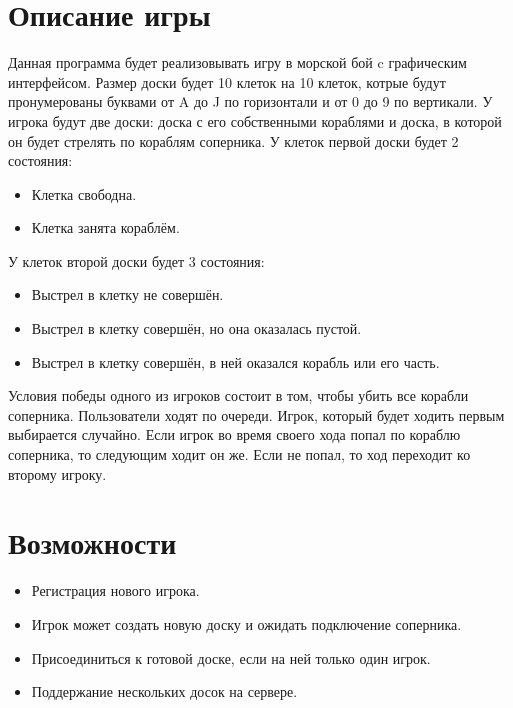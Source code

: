 \documentclass[a4paper,14pt]{extarticle} %
\begin{document}
\section*{Описание игры}
Данная программа будет реализовывать игру в морской бой c графическим интерфейсом. Размер доски будет 10 клеток на 10 клеток, котрые будут пронумерованы буквами от A до J по горизонтали и от 0 до 9 по вертикали. У игрока будут две доски: доска с его собственными кораблями и доска, в которой он будет стрелять по кораблям соперника. У клеток первой доски будет 2 состояния:
\begin{itemize}
\item{Клетка свободна.}
\item{Клетка занята кораблём.}
\end{itemize}
У клеток второй доски будет 3 состояния:
\begin{itemize}
\item{Выстрел в клетку не совершён.}
\item{Выстрел в клетку совершён, но она оказалась пустой.}
\item{Выстрел в клетку совершён, в ней оказался корабль или его часть.}
\end{itemize}
Условия победы одного из игроков состоит в том, чтобы
убить все корабли соперника. Пользователи ходят по очереди. Игрок, который будет ходить первым выбирается случайно. Если игрок во время своего хода попал по кораблю соперника, то следующим ходит он же. Если не попал, то ход переходит ко второму игроку.

\newpage
\section*{Возможности}
\begin{itemize}
\item{Регистрация нового игрока.}
\item{Игрок может создать новую доску и ожидать подключение соперника.}
\item{Присоединиться к готовой доске, если на ней только один игрок.}
\item{Поддержание нескольких досок на сервере.}
\end{itemize}

\newpage
\end{document}
